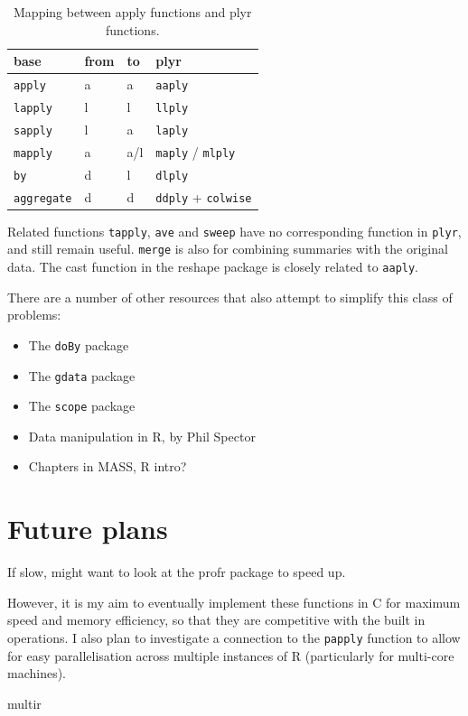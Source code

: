 \documentclass[letterpage]{scrartcl}
\newcommand{\code}[1]{\lstinline!#1!}
\begin{document}
\begin{table}[htpb]
  \begin{center}
  \begin{tabular}{llll}
    \toprule
    base & from & to & plyr \\
    \midrule
    \code{apply }    & a & a   & \code{aaply} \\
    \code{lapply}    & l & l   & \code{llply} \\
    \code{sapply}    & l & a   & \code{laply} \\
    \code{mapply}    & a & a/l & \code{maply} / \code{mlply} \\
    \code{by}        & d & l   & \code{dlply} \\
    \code{aggregate} & d & d   & \code{ddply} + \code{colwise} \\
    \bottomrule
  \end{tabular}
  \end{center}
  \caption{Mapping between apply functions and plyr functions.}
  \label{tbl:equiv}
\end{table}

Related functions {\tt tapply}, {\tt ave} and {\tt sweep} have no corresponding function in {\tt plyr}, and still remain useful. {\tt merge} is also for combining summaries with the original data.  The cast function in the reshape package \citep{reshape} is closely related to {\tt aaply}.

There are a number of other resources that also attempt to simplify this class of problems:

\begin{itemize}
  \item The {\tt doBy} package
  \item The {\tt gdata} package
  \item The {\tt scope} package
  \item Data manipulation in R, by Phil Spector
  \item Chapters in MASS, R intro?
  
\end{itemize}

\section{Future plans}
\label{sec:future}

If slow, might want to look at the profr package to speed up.  

However, it is my aim to eventually implement these functions in C for maximum speed and memory efficiency, so that they are competitive with the built in operations.  I also plan to investigate a connection to the {\tt papply} function to allow for easy parallelisation across multiple instances of R (particularly for multi-core machines).

multir


\end{document}
